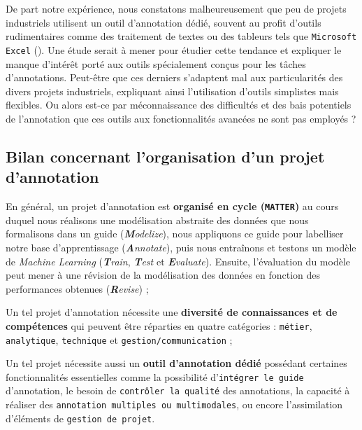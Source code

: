 		\begin{leftBarAuthorOpinion}
			De part notre expérience, nous constatons malheureusement que peu de projets industriels utilisent un outil d'annotation dédié, souvent au profit d'outils rudimentaires comme des traitement de textes ou des tableurs tels que \texttt{Microsoft Excel} (\cite{microsoft-corporation:2018:microsoft-excel}).
			Une étude serait à mener pour étudier cette tendance et expliquer le manque d'intérêt porté aux outils spécialement conçus pour les tâches d'annotations.
			Peut-être que ces derniers s'adaptent mal aux particularités des divers projets industriels, expliquant ainsi l'utilisation d'outils simplistes mais flexibles. Ou alors est-ce par méconnaissance des difficultés et des bais potentiels de l'annotation que ces outils aux fonctionnalités avancées ne sont pas employés ?
		\end{leftBarAuthorOpinion}
	
	
	\subsection{Bilan concernant l'organisation d'un projet d'annotation}
	\label{section:2.2.4-ORGANISATION-ANNOTATION-BILAN}
	
	\begin{leftBarSummary}
		\begin{todolist}
			\item[\itemok] En général, un projet d'annotation est \textbf{organisé en cycle (\texttt{MATTER})} au cours duquel nous réalisons une modélisation abstraite des données que nous formalisons dans un guide (\textit{\textbf{M}odelize}), nous appliquons ce guide pour labelliser notre base d'apprentissage (\textit{\textbf{A}nnotate}), puis nous entraînons et testons un modèle de \textit{Machine Learning} (\textit{\textbf{T}rain}, \textit{\textbf{T}est} et \textit{\textbf{E}valuate}).
			Ensuite, l'évaluation du modèle peut mener à une révision de la modélisation des données en fonction des performances obtenues (\textit{\textbf{R}evise}) ;
			\item[\itemok] Un tel projet d'annotation nécessite une \textbf{diversité de connaissances et de compétences} qui peuvent être réparties en quatre catégories : \texttt{métier}, \texttt{analytique}, \texttt{technique} et \texttt{gestion/communication} ;
			\item[\itemok] Un tel projet nécessite aussi un \textbf{outil d'annotation dédié} possédant certaines fonctionnalités essentielles comme la possibilité d'\texttt{intégrer le guide} d'annotation, le besoin de \texttt{contrôler la qualité} des annotations, la capacité à réaliser des \texttt{annotation multiples ou multimodales}, ou encore l'assimilation d'éléments de \texttt{gestion de projet}.
		\end{todolist}
	\end{leftBarSummary}